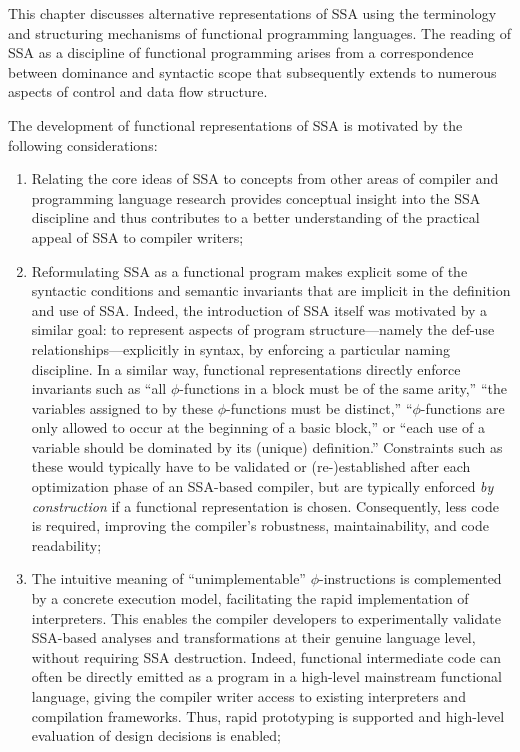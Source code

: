 {%
\label{section:Part1:Semantics:Intro}
This chapter discusses alternative representations of SSA using the
terminology and structuring mechanisms of functional programming
languages. The reading of SSA as a discipline of functional
programming arises from a correspondence between dominance and
syntactic scope that subsequently extends to numerous aspects of
control and data flow structure.

The development of functional representations of SSA is motivated by
the following considerations:

\begin{enumerate}
\item Relating the core ideas of SSA to concepts from other
areas of compiler and programming language research provides
conceptual insight into the SSA discipline and thus contributes to a
better understanding of the practical appeal of SSA to compiler
writers;

\item
Reformulating SSA as a functional program makes explicit some of the
syntactic conditions and semantic invariants that are implicit in
the definition and use of SSA. Indeed, the introduction of
SSA itself was motivated by a similar goal: to represent aspects of
program structure---namely the def-use 
relationships---explicitly in syntax, by enforcing a particular naming 
discipline. In
a similar way, functional representations directly enforce
invariants such as ``all $\phi$-functions in a block must be of the
same arity,'' ``the variables assigned to by these $\phi$-functions
must be distinct,'' ``$\phi$-functions are only allowed to occur at
the beginning of a basic block,'' or ``each use of a variable should
be dominated by its (unique) definition.'' Constraints such as these
would typically have to be validated or (re-)established after each
optimization phase of an SSA-based compiler, but are typically
enforced \emph{by construction} if a functional representation is
chosen. Consequently, less code is required, improving the
compiler's robustness, maintainability, and code readability;

\item The intuitive meaning of ``unimplementable'' $\phi$-instructions is
complemented by a concrete execution model, facilitating the rapid
implementation of interpreters. This enables the compiler developers to
experimentally validate SSA-based analyses and transformations at
their genuine language level, without requiring SSA
destruction. Indeed, functional intermediate code can often be
directly emitted as a program in a high-level mainstream functional
language, giving the compiler writer access to existing interpreters
and compilation frameworks. Thus, rapid prototyping is supported and
high-level evaluation of design decisions is enabled;


\end{enumerate}}
